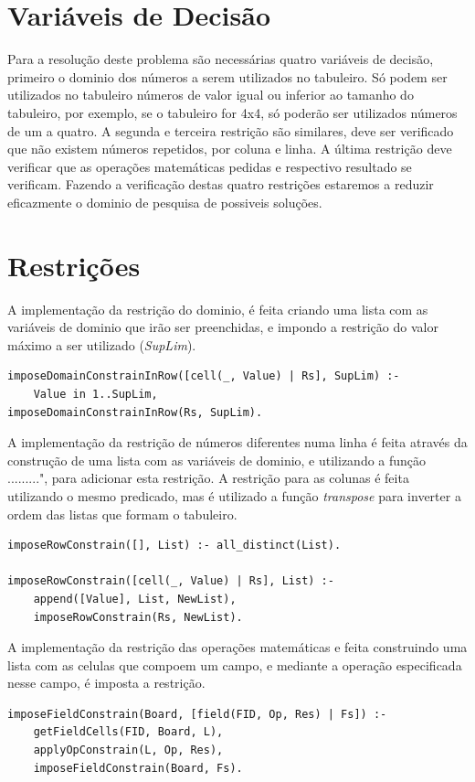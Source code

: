 \documentclass[runningheads,a4paper]{llncs}
\begin{document}
\section{Variáveis de Decisão}
Para a resolução deste problema são necessárias quatro variáveis de decisão, primeiro o dominio dos números a serem utilizados no tabuleiro. Só podem ser utilizados no tabuleiro números de valor igual ou inferior ao tamanho do tabuleiro, por exemplo, se o tabuleiro for 4x4, só poderão ser utilizados números de um a quatro.
A segunda e terceira restrição são similares, deve ser verificado que não existem números repetidos, por coluna e linha.
A última restrição deve verificar que as operações matemáticas pedidas e respectivo resultado se verificam.
Fazendo a verificação destas quatro restrições estaremos a reduzir eficazmente o dominio de pesquisa de possiveis soluções.

\newpage
\section{Restrições}
A implementação da restrição do dominio, é feita criando uma lista com as variáveis de dominio que irão ser preenchidas, e impondo a restrição do valor máximo a ser utilizado (\emph{SupLim}).
\noindent
\begin{verbatim}
imposeDomainConstrainInRow([cell(_, Value) | Rs], SupLim) :- 
	Value in 1..SupLim,										 					 				imposeDomainConstrainInRow(Rs, SupLim).
\end{verbatim}

A implementação da restrição de números diferentes numa linha é feita através da construção de uma lista com as variáveis de dominio, e utilizando a função .........", para adicionar esta restrição.
A restrição para as colunas é feita utilizando o mesmo predicado, mas é utilizado a função \emph{transpose} para inverter a ordem das listas que formam o tabuleiro.
\begin{verbatim}
imposeRowConstrain([], List) :- all_distinct(List).

imposeRowConstrain([cell(_, Value) | Rs], List) :- 
	append([Value], List, NewList),
	imposeRowConstrain(Rs, NewList).
\end{verbatim}

A implementação da restrição das operações matemáticas e feita construindo uma lista com as celulas que compoem um campo, e mediante a operação especificada nesse campo, é imposta a restrição.
\begin{verbatim}
imposeFieldConstrain(Board, [field(FID, Op, Res) | Fs]) :- 
	getFieldCells(FID, Board, L),
	applyOpConstrain(L, Op, Res),
	imposeFieldConstrain(Board, Fs).
\end{verbatim}
\end{document}
